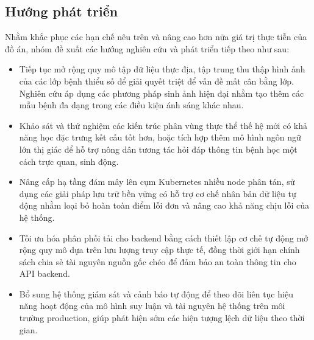 \subsection{Hướng phát triển}
Nhằm khắc phục các hạn chế nêu trên và nâng cao hơn nữa giá trị thực tiễn của đồ án, nhóm đề xuất các hướng nghiên cứu và phát triển tiếp theo như sau:
\begin{itemize}
  \item Tiếp tục mở rộng quy mô tập dữ liệu thực địa, tập trung thu thập hình ảnh của các lớp bệnh thiểu số để giải quyết triệt để vấn đề mất cân bằng lớp. Nghiên cứu áp dụng các phương pháp sinh ảnh hiện đại nhằm tạo thêm các mẫu bệnh đa dạng trong các điều kiện ánh sáng khác nhau.
  \item Khảo sát và thử nghiệm các kiến trúc phân vùng thực thể thế hệ mới có khả năng học đặc trưng kết cấu tốt hơn, hoặc tích hợp thêm mô hình ngôn ngữ lớn thị giác để hỗ trợ nông dân tương tác hỏi đáp thông tin bệnh học một cách trực quan, sinh động.
  \item Nâng cấp hạ tầng đám mây lên cụm Kubernetes nhiều node phân tán, sử dụng các giải pháp lưu trữ bền vững có hỗ trợ cơ chế nhân bản dữ liệu tự động nhằm loại bỏ hoàn toàn điểm lỗi đơn và nâng cao khả năng chịu lỗi của hệ thống.
  \item Tối ưu hóa phân phối tải cho backend bằng cách thiết lập cơ chế tự động mở rộng quy mô dựa trên lưu lượng truy cập thực tế, đồng thời giới hạn chính sách chia sẻ tài nguyên nguồn gốc chéo để đảm bảo an toàn thông tin cho API backend.
  \item Bổ sung hệ thống giám sát và cảnh báo tự động để theo dõi liên tục hiệu năng hoạt động của mô hình suy luận và tài nguyên hệ thống trên môi trường production, giúp phát hiện sớm các hiện tượng lệch dữ liệu theo thời gian.
\end{itemize}
